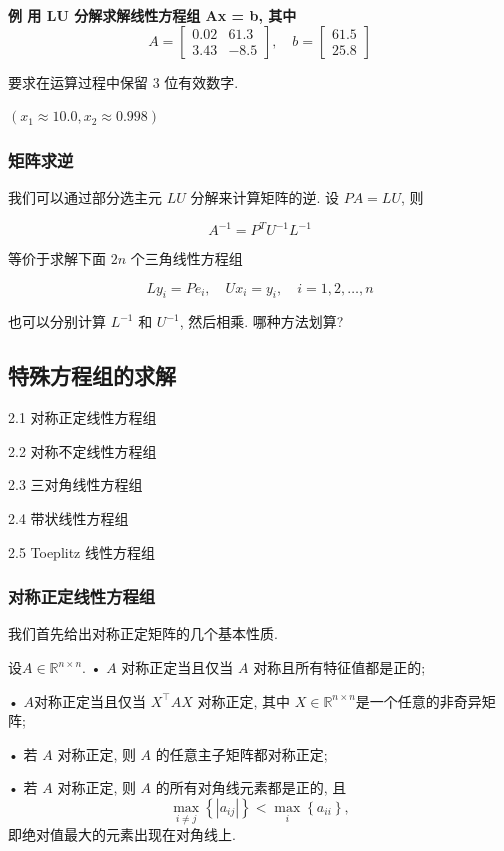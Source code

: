 \documentclass[12pt,a4paper]{article}
\begin{document}
\begin{framed}
	\bfseries{例} 用 LU 分解求解线性方程组 Ax = b, 其中
	\begin{equation}
	A=\left[\begin{array}{cc}{0.02} & {61.3} \\ {3.43} & {-8.5}\end{array}\right], \quad b=\left[\begin{array}{c}{61.5} \\ {25.8}\end{array}\right]
	\end{equation}
	
	要求在运算过程中保留 3 位有效数字.	
	
	$(x_1 ≈ 10.0, x_2 ≈ 0.998)$
\end{framed}

\subsubsection{矩阵求逆}
我们可以通过部分选主元 $LU$ 分解来计算矩阵的逆. 设 $P A = LU$, 则

$$
A^{-1}=P^{T} U^{-1} L^{-1}
$$

等价于求解下面 $2n$ 个三角线性方程组

$$
L y_{i}=P e_{i}, \quad U x_{i}=y_{i}, \quad i=1,2, \ldots, n
$$

也可以分别计算 $L^{-1}$ 和 $U^{−1}$, 然后相乘. 哪种方法划算?

\subsection{特殊方程组的求解}

2.1 对称正定线性方程组

2.2 对称不定线性方程组

2.3 三对角线性方程组

2.4 带状线性方程组

2.5 Toeplitz 线性方程组

\subsubsection{对称正定线性方程组}

我们首先给出对称正定矩阵的几个基本性质.
\begin{framed}
	\begin{theorem}
		设$ A ∈ \mathbb{R}^{n×n}$.
		• $A$ 对称正定当且仅当 $A$ 对称且所有特征值都是正的;
		
		• $A $对称正定当且仅当 $X^{⊺}AX$ 对称正定, 其中 $X ∈ \mathbb{R}^{n×n} $是一个任意的非奇异矩阵;
		
		• 若 $A$ 对称正定, 则 $A$ 的任意主子矩阵都对称正定;
		
		• 若 $A$ 对称正定, 则 $A$ 的所有对角线元素都是正的, 且
		$$
		\max _{i \neq j}\left\{\left|a_{i j}\right|\right\}<\max _{i}\left\{a_{i i}\right\}
		,$$即绝对值最大的元素出现在对角线上.
	\end{theorem}
\end{framed}
\end{document}
